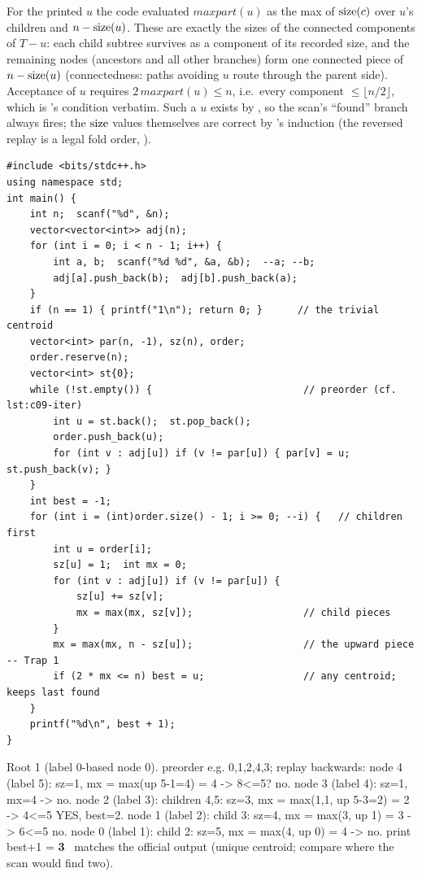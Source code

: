 \begin{proofbox}
For the printed $u$ the code evaluated $\mathit{maxpart}(u)$ as the max of $\operatorname{size}(c)$
over $u$'s children and $n-\operatorname{size}(u)$. These are exactly the sizes of the connected
components of $T - u$: each child subtree survives as a component of its recorded size,
and the remaining nodes (ancestors and all other branches) form one connected piece of
$n - \operatorname{size}(u)$ (connectedness: paths avoiding $u$ route through the parent side).
Acceptance of $u$ requires $2\,\mathit{maxpart}(u) \le n$, i.e.\ every component
$\le \lfloor n/2\rfloor$, which is 's condition verbatim. Such a
$u$ exists by , so the scan's ``found'' branch always fires; the
$\operatorname{size}$ values themselves are correct by 's induction (the reversed
replay is a legal fold order, ).
\end{proofbox}

\begin{lstlisting}[caption={CSES 2079 -- iterative size pass, then the maxpart scan}, label={lst:c09-2079-soln}]
#include <bits/stdc++.h>
using namespace std;
int main() {
    int n;  scanf("%d", &n);
    vector<vector<int>> adj(n);
    for (int i = 0; i < n - 1; i++) {
        int a, b;  scanf("%d %d", &a, &b);  --a; --b;
        adj[a].push_back(b);  adj[b].push_back(a);
    }
    if (n == 1) { printf("1\n"); return 0; }      // the trivial centroid
    vector<int> par(n, -1), sz(n), order;
    order.reserve(n);
    vector<int> st{0};
    while (!st.empty()) {                          // preorder (cf. lst:c09-iter)
        int u = st.back();  st.pop_back();
        order.push_back(u);
        for (int v : adj[u]) if (v != par[u]) { par[v] = u; st.push_back(v); }
    }
    int best = -1;
    for (int i = (int)order.size() - 1; i >= 0; --i) {   // children first
        int u = order[i];
        sz[u] = 1;  int mx = 0;
        for (int v : adj[u]) if (v != par[u]) {
            sz[u] += sz[v];
            mx = max(mx, sz[v]);                   // child pieces
        }
        mx = max(mx, n - sz[u]);                   // the upward piece -- Trap 1
        if (2 * mx <= n) best = u;                 // any centroid; keeps last found
    }
    printf("%d\n", best + 1);
}
\end{lstlisting}

\begin{tracebox}
Root 1 (label 0-based node 0). preorder e.g. 0,1,2,4,3; replay backwards:
node 4 (label 5): sz=1, mx = max(up 5-1=4) = 4 -> 8<=5? no.
node 3 (label 4): sz=1, mx=4 -> no.
node 2 (label 3): children 4,5: sz=3, mx = max(1,1, up 5-3=2) = 2 -> 4<=5 YES, best=2.
node 1 (label 2): child 3: sz=4, mx = max(3, up 1) = 3 -> 6<=5 no.
node 0 (label 1): child 2: sz=5, mx = max(4, up 0) = 4 -> no.
print best+1 = \textbf{3} \checkmark\ matches the official output (unique centroid;
compare  where the scan would find two).
\end{tracebox}

